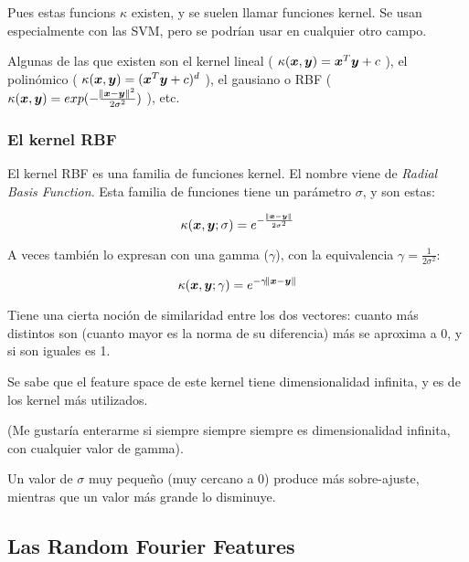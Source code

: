 \documentclass{article}
\begin{document}
Pues estas funcions $\kappa$ existen, y se suelen llamar funciones kernel. Se usan
especialmente con las SVM, pero se podrían usar en cualquier otro campo.

Algunas de las que existen son el kernel lineal (
$\kappa(\bm{x}, \bm{y}) = \bm{x}^T\bm{y} + c$
), el polinómico (
$\kappa(\bm{x}, \bm{y}) = (\bm{x}^T\bm{y} + c)^d$
), el gausiano o RBF (
$\kappa(\bm{x}, \bm{y}) = exp(-\frac{\norm{\bm{x} - \bm{y}}^2}{2\sigma^2})$
), etc.

\subsubsection{El kernel RBF}

El kernel RBF es una familia de funciones kernel. El nombre viene de
\textit{Radial Basis Function}. Esta familia de funciones tiene un parámetro
$\sigma$, y son estas:

\begin{equation}
 \kappa({\bm{x}, \bm{y}}; \sigma) = e^{-\frac{\norm{\bm{x} - \bm{y}}}{2\sigma^2}}
\end{equation}

A veces también lo expresan con una gamma ($\gamma$), con la equivalencia
$\gamma = \frac{1}{2\sigma^2}$:

\begin{equation}
 \kappa({\bm{x}, \bm{y}}; \gamma) = e^{-\gamma\norm{\bm{x} - \bm{y}}}
\end{equation}

Tiene una cierta noción de similaridad entre los dos vectores: cuanto más
distintos son (cuanto mayor es la norma de su diferencia) más se aproxima a 0,
y si son iguales es 1.


Se sabe que el feature space de este kernel tiene dimensionalidad infinita, y
es de los kernel más utilizados.

(Me gustaría enterarme si siempre siempre siempre es dimensionalidad infinita,
con cualquier valor de gamma).

Un valor de $\sigma$ muy pequeño (muy cercano a 0) produce más sobre-ajuste,
mientras que un valor más grande lo disminuye.


\subsection{Las Random Fourier Features}
\end{document}
